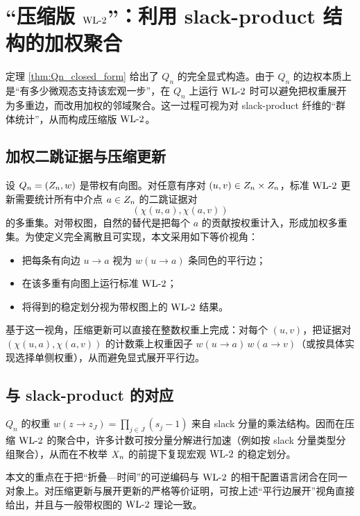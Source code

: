 
\section{“压缩版 $\mathrm{WL}\text{-}2$”：利用 slack-product 结构的加权聚合}

定理 \ref{thm:Qn_closed_form} 给出了 $Q_n$ 的完全显式构造。由于 $Q_n$ 的边权本质上是“有多少微观态支持该宏观一步”，在 $Q_n$ 上运行 $\mathrm{WL}\text{-}2$ 时可以避免把权重展开为多重边，而改用加权的邻域聚合。这一过程可视为对 slack-product 纤维的“群体统计”，从而构成压缩版 $\mathrm{WL}\text{-}2$。

\subsection{加权二跳证据与压缩更新}

设 $Q_n=(Z_n, w)$ 是带权有向图。对任意有序对 $(u,v)\in Z_n\times Z_n$，标准 $\mathrm{WL}\text{-}2$ 更新需要统计所有中介点 $a\in Z_n$ 的二跳证据对
$$
(\chi(u,a),\chi(a,v))
$$
的多重集。对带权图，自然的替代是把每个 $a$ 的贡献按权重计入，形成加权多重集。为使定义完全离散且可实现，本文采用如下等价视角：
\begin{itemize}
  \item 把每条有向边 $u\to a$ 视为 $w(u\to a)$ 条同色的平行边；
  \item 在该多重有向图上运行标准 $\mathrm{WL}\text{-}2$；
  \item 将得到的稳定划分视为带权图上的 $\mathrm{WL}\text{-}2$ 结果。
\end{itemize}

基于这一视角，压缩更新可以直接在整数权重上完成：对每个 $(u,v)$，把证据对 $(\chi(u,a),\chi(a,v))$ 的计数乘上权重因子 $w(u\to a)\,w(a\to v)$（或按具体实现选择单侧权重），从而避免显式展开平行边。

\subsection{与 slack-product 的对应}

$Q_n$ 的权重 $w(z\to z_J)=\prod_{j\in J}(s_j-1)$ 来自 slack 分量的乘法结构。因而在压缩 $\mathrm{WL}\text{-}2$ 的聚合中，许多计数可按分量分解进行加速（例如按 slack 分量类型分组聚合），从而在不枚举 $X_n$ 的前提下复现宏观 $\mathrm{WL}\text{-}2$ 的稳定划分。

\begin{remark}
本文的重点在于把“折叠—时间”的可逆编码与 $\mathrm{WL}\text{-}2$ 的相干配置语言闭合在同一对象上。对压缩更新与展开更新的严格等价证明，可按上述“平行边展开”视角直接给出，并且与一般带权图的 $\mathrm{WL}\text{-}2$ 理论一致。
\end{remark}

